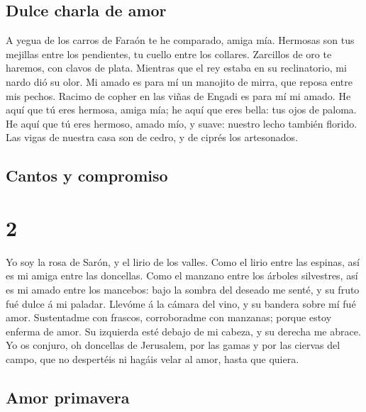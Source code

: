 \hypertarget{dulce-charla-de-amor}{%
\subsection{Dulce charla de amor}\label{dulce-charla-de-amor}}

 A yegua de los carros de Faraón te he comparado, amiga
mía.  Hermosas son tus mejillas entre los pendientes, tu
cuello entre los collares.  Zarcillos de oro te haremos,
con clavos de plata.  Mientras que el rey estaba en su
reclinatorio, mi nardo dió su olor.  Mi amado es para mí
un manojito de mirra, que reposa entre mis pechos. 
Racimo de copher en las viñas de Engadi es para mí mi amado.
 He aquí que tú eres hermosa, amiga mía; he aquí que eres
bella: tus ojos de paloma.  He aquí que tú eres hermoso,
amado mío, y suave: nuestro lecho también florido.  Las
vigas de nuestra casa son de cedro, y de ciprés los artesonados.

\hypertarget{cantos-y-compromiso}{%
\subsection{Cantos y compromiso}\label{cantos-y-compromiso}}

\hypertarget{section-22-2}{%
\section{2}\label{section-22-2}}

 Yo soy la rosa de Sarón, y el lirio de los valles.
 Como el lirio entre las espinas, así es mi amiga entre
las doncellas.  Como el manzano entre los árboles
silvestres, así es mi amado entre los mancebos: bajo la sombra del
deseado me senté, y su fruto fué dulce á mi paladar. 
Llevóme á la cámara del vino, y su bandera sobre mí fué amor.
 Sustentadme con frascos, corroboradme con manzanas;
porque estoy enferma de amor.  Su izquierda esté debajo de
mi cabeza, y su derecha me abrace.  Yo os conjuro, oh
doncellas de Jerusalem, por las gamas y por las ciervas del campo, que
no despertéis ni hagáis velar al amor, hasta que quiera.

\hypertarget{amor-primavera}{%
\subsection{Amor primavera}\label{amor-primavera}}

